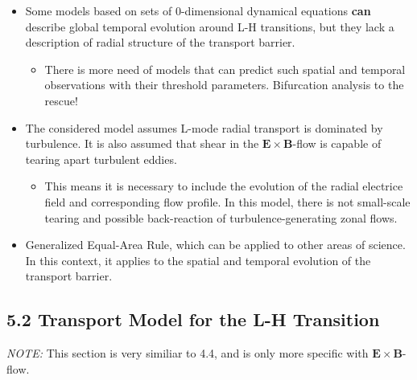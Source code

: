 \documentclass[a4paper]{article}
\begin{document}
\begin{itemize}
\item
  Some models based on sets of 0-dimensional dynamical equations
  \textbf{can} describe global temporal evolution around L-H
  transitions, but they lack a description of radial structure of the
  transport barrier.

  \begin{itemize}
  \itemsep1pt\parskip0pt
  \item
    There is more need of models that can predict such spatial and
    temporal observations with their threshold parameters. Bifurcation
    analysis to the rescue!
  \end{itemize}
\item
  The considered model assumes L-mode radial transport is dominated by
  turbulence. It is also assumed that shear in the
  $\mathbf{E}\times\mathbf{B}$-flow is capable of tearing apart
  turbulent eddies.

  \begin{itemize}
  \itemsep1pt\parskip0pt
  \item
    This means it is necessary to include the evolution of the radial
    electrice field and corresponding flow profile. In this model, there
    is not small-scale tearing and possible back-reaction of
    turbulence-generating zonal flows.
  \end{itemize}
\item
  Generalized Equal-Area Rule, which can be applied to other areas of
  science. In this context, it applies to the spatial and temporal
  evolution of the transport barrier.
\end{itemize}

\subsection{5.2 Transport Model for the L-H
Transition}\label{transport-model-for-the-l-h-transition-1}

\emph{NOTE:} This section is very similiar to 4.4, and is only more
specific with $\mathbf{E}\times\mathbf{B}$-flow.
\end{document}
